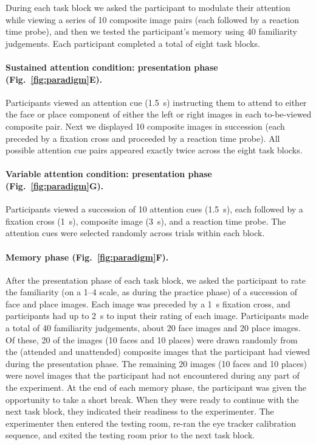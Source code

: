 \documentclass[english]{article}
\begin{document}
During each task block we asked the participant to modulate their attention
while viewing a series of 10 composite image pairs (each followed by a reaction
time probe), and then we tested the participant's memory using 40 familiarity
judgements. Each participant completed a total of eight task blocks.

\paragraph*{Sustained attention condition: presentation phase
(Fig.~\ref{fig:paradigm}E).}

Participants viewed an attention cue (1.5~s) instructing them to attend to
either the face or place component of either the left or right images in each
to-be-viewed composite pair. Next we displayed 10 composite images in
succession (each preceded by a fixation cross and proceeded by a reaction time
probe). All possible attention cue pairs appeared exactly twice across the
eight task blocks.

\paragraph*{Variable attention condition: presentation phase
(Fig.~\ref{fig:paradigm}G).}

Participants viewed a succession of 10 attention cues (1.5~s), each followed by
a fixation cross (1~s), composite image (3~s), and a reaction time probe. The
attention cues were selected randomly across trials within each block.

\paragraph*{Memory phase (Fig.~\ref{fig:paradigm}F).}

After the presentation phase of each task block, we asked the participant to
rate the familiarity (on a 1--4 scale, as during the practice phase) of a
succession of face and place images. Each image was preceded by a 1~s fixation
cross, and participants had up to 2~s to input their rating of each image.
Participants made a total of 40 familiarity judgements, about 20 face images
and 20 place images. Of these, 20 of the images (10 faces and 10 places) were
drawn randomly from the (attended and unattended) composite images that the
participant had viewed during the presentation phase. The remaining 20 images
(10 faces and 10 places) were novel images that the participant had not
encountered during any part of the experiment. At the end of each memory phase,
the participant was given the opportunity to take a short break. When they were
ready to continue with the next task block, they indicated their readiness to
the experimenter. The experimenter then entered the testing room, re-ran the
eye tracker calibration sequence, and exited the testing room prior to the next
task block.
\end{document}

